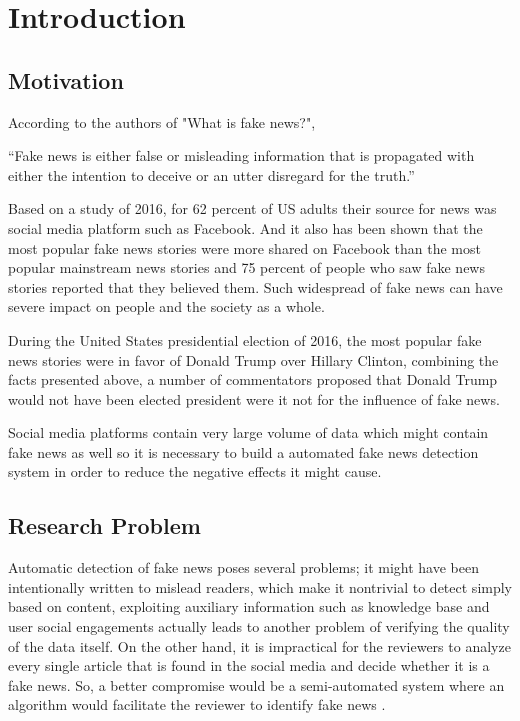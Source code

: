 \chapter{Introduction}\label{introduction}

\section{Motivation}\label{intro:motivation}
According to the authors of "What is fake news?"\cite{jasterfake}, 

\enquote{Fake news is either false or misleading information that is propagated with either the intention to deceive or an utter disregard for the truth.}

Based on a study of 2016, for 62 percent of US adults their source for news was social media platform such as Facebook\cite{gottfried2016news}. And it also has been shown that the most popular fake news stories were more shared on Facebook than the most popular mainstream news stories\cite{silverman2016analysis} and 75 percent of people who saw fake news stories reported that they believed them\cite{silverman2016most}. Such widespread of fake news can have severe impact on people and the society as a whole.\par
During the United States presidential election of 2016, the most popular fake news stories were in favor of Donald Trump over Hillary Clinton\cite{silverman2016analysis}, combining the facts presented above, a number of commentators proposed that Donald Trump would not have been elected president were it not for the influence of fake news\cite{parkinson2016click}\cite{read2016donald}\cite{dewey2016facebook}.

Social media platforms contain very large volume of data which might contain fake news as well so it is necessary to build a automated fake news detection system in order to reduce the negative effects it might cause.

\section{Research Problem} \label{intro:research}
Automatic detection of fake news poses several problems; it might have been intentionally written to mislead readers, which make it nontrivial to detect simply based on content, exploiting auxiliary information such as knowledge base and user social engagements actually leads to another problem of verifying the quality of the data itself\cite{shu2017fake}. On the other hand, it is impractical for the reviewers to analyze every single article that is found in the social media and decide whether it is a fake news. So, a better compromise would be a semi-automated system where an algorithm would facilitate the reviewer to identify fake news \cite{conroy2015automatic} \cite{chen2015news} \cite{wiegand2016veracity}.

